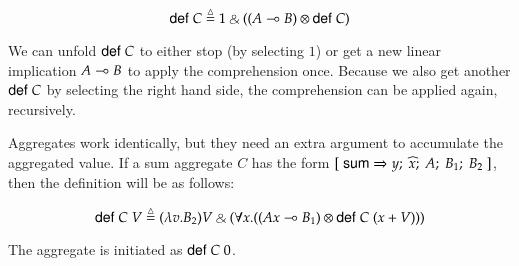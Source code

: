 \[
\compr{C} \defeq 1 \with ((A \lolli B) \otimes \compr{C})
\]

We can unfold $\mathsf{def} \; C$ to either stop (by selecting $1$) or get a new linear implication $A \multimap B$
to apply the comprehension once. Because we also get another $\mathsf{def} \; C$ by selecting the right hand side,
the comprehension can be applied again, recursively.

Aggregates work identically, but they need an extra argument to accumulate the aggregated value. If a sum aggregate $C$ has the form $[\;\mathsf{sum} \Rightarrow y; \; \widehat{x}; \; A; \; B_1; \; B_2 \;]$, then the definition will be as follows:

\[
\compr{C} \; V \defeq (\lambda v. B_2)V \with (\forall x. ((Ax \lolli B_1) \otimes \compr{C} \; (x + V)))
\]

The aggregate is initiated as $\mathsf{def} \; C \; 0$.

